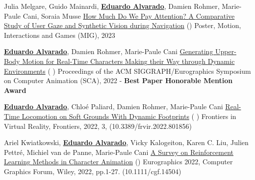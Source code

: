 \begin{cventries}
\cvpublication
    {Julia Melgare, Guido Mainardi, \textbf{\underline{Eduardo Alvarado}}, Damien Rohmer, Marie-Paule Cani, Soraia Musse} %
    {\href{https://project.inria.fr/mig2023/files/2023/11/poster_6.pdf} {How {Much} {Do} {We} {Pay} {Attention}? {A} {Comparative} {Study} of {User} {Gaze} and {Synthetic} {Vision} during {Navigation}} (\href{https://project.inria.fr/mig2023/files/2023/11/poster_6.pdf}{})} %
    {Poster, Motion, Interactions and Games (MIG), 2023} %

\cvpublication
    {\textbf{\underline{Eduardo Alvarado}}, Damien Rohmer, Marie-Paule Cani} %
    {\href{https://edualvarado.com/generating-upper-body-motion/} {Generating {Upper}-{Body} {Motion} for {Real}-{Time} {Characters} {Making} their {Way} through {Dynamic} {Environments}} (\href{https://github.com/edualvarado/unity-antagonistic-controller}{} \href{https://hal.inria.fr/hal-03757439v1}{} \href{https://www.youtube.com/watch?v=dq4FJH1atWM}{})} %
    {Proceedings of the ACM SIGGRAPH/Eurographics Symposium on Computer Animation (SCA), 2022 - \textbf{Best Paper Honorable Mention Award}} %
    
\cvpublication
    {\textbf{\underline{Eduardo Alvarado}}, Chloé Paliard, Damien Rohmer, Marie-Paule Cani} %
    {\href{https://edualvarado.com/soft-grounds/}{Real-{Time} {Locomotion} on {Soft} {Grounds} {With} {Dynamic} {Footprints}} (\href{https://github.com/edualvarado/unity-footprints}{} \href{https://hal.inria.fr/hal-03630136}{} \href{https://youtu.be/aWBntnCOwEE}{})} %
    {Frontiers in Virtual Reality, Frontiers, 2022, 3, (10.3389/frvir.2022.801856)} %

\cvpublication
    {Ariel Kwiatkowski, \textbf{\underline{Eduardo Alvarado}}, Vicky Kalogeiton, Karen C. Liu, Julien Pettr{\'{e}}, Michiel van de Panne, Marie-Paule Cani} %
    {\href{https://edualvarado.com/reinforcement-learning-methods-in-character-animation/}{A {Survey} on {Reinforcement} {Learning} {Methods} in {Character} {Animation}} (\href{https://hal.inria.fr/hal-03600947}{})} %
    {Eurographics 2022, Computer Graphics Forum, Wiley, 2022, pp.1-27. (10.1111/cgf.14504)} %


\end{cventries}
